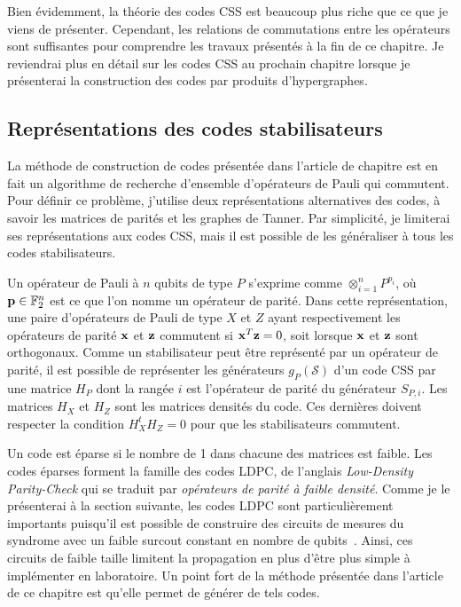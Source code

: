 Bien évidemment,
la théorie des codes CSS est beaucoup plus riche que ce que je viens de présenter.
Cependant,
les relations de commutations entre les opérateurs sont suffisantes pour comprendre
les travaux présentés à la fin de ce chapitre.
Je reviendrai plus en détail sur les codes CSS au prochain chapitre lorsque je présenterai
la construction des codes par produits d'hypergraphes.
 
\subsection{Représentations des codes stabilisateurs}
\label{sec:representations_codes}

La méthode de construction de codes présentée dans l'article de chapitre est en fait un algorithme
de recherche d'ensemble d'opérateurs de Pauli qui commutent.
Pour définir ce problème,
j'utilise deux représentations alternatives des codes, à savoir les matrices de parités et les graphes de Tanner.
Par simplicité,
je limiterai ses représentations aux codes CSS,
mais il est possible de les généraliser à tous les codes stabilisateurs.

Un opérateur de Pauli à $n$ qubits de type $P$ s'exprime comme $\otimes_{i=1}^{n} P^{p_i}$,
où $\vb p \in \mathbb{F}_{2}^{n}$ est ce que l'on nomme un opérateur de parité.
Dans cette représentation,
une paire d'opérateurs de Pauli de type $X$ et $Z$ ayant respectivement les opérateurs de parité $\vb x$ 
et $\vb z$ commutent si $\vb x^T \vb z = 0$,
soit lorsque $\vb x$ et $\vb z$ sont orthogonaux.
Comme un stabilisateur peut être représenté par un opérateur de parité,
il est possible de représenter les générateurs $g_P(\mathcal S)$ d'un code CSS
par une matrice $H_P$ dont la rangée $i$ est l'opérateur de parité du
générateur $S_{P, i}$.
Les matrices $H_X$ et $H_Z$ sont les matrices densités du code.
Ces dernières doivent respecter la condition $H_X^t H_Z = 0$ pour 
que les stabilisateurs commutent.

Un code est éparse si le nombre de 1 dans chacune des matrices est faible.
Les codes éparses forment la famille des codes LDPC,
de l'anglais \textit{Low-Density Parity-Check} qui se traduit par
\textit{opérateurs de parité à faible densité}.
Comme je le présenterai à la section suivante,
les codes LDPC sont particulièrement importants puisqu'il est possible de construire
des circuits de mesures du syndrome avec un faible surcout
constant en nombre de qubits~\cite{gottesman_fault-tolerant_2013}.
Ainsi,
ces circuits de faible taille limitent la propagation en plus d'être plus simple à 
implémenter en laboratoire.
Un point fort de la méthode présentée dans l'article de ce chapitre est qu'elle permet 
de générer de tels codes.

